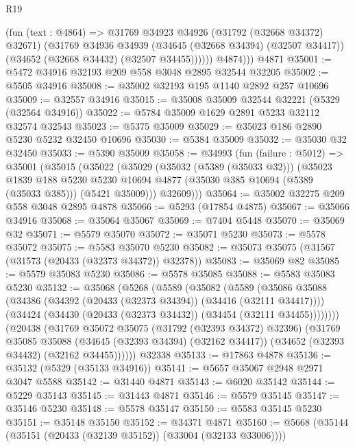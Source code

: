 \begin{lexlean}{R19}
\begin{coremodule}
            (fun (text : @4864) =>
            @31769
              @34923
              @34926
              (@31792 (@32668 @34372) @32671)
              (@31769
                @34936
                @34939
                (@34645 (@32668 @34394) (@32507 @34417))
                (@34652 (@32668 @34432) (@32507 @34455))))))
          @4874)))
    @4871
@35001 := @5472 @34916 @32193 @209 @558 @3048 @2895 @32544 @32205
@35002 := @5505 @34916
@35008 := @35002 @32193 @195 @1140 @2892 @257 @10696
@35009 := @32557 @34916
@35015 := @35008 @35009 @32544 @32221 (@5329 (@32564 @34916))
@35022 := @5784 @35009 @1629 @2891 @5233 @32112 @32574 @32543
@35023 := @5375 @35009
@35029 := @35023 @186 @2890 @5230 @5232 @32450 @10696
@35030 := @5384 @35009
@35032 := @35030 @32 @32450
@35033 := @5390 @35009
@35058 := @34993
    (fun (failure : @5012) =>
    @35001
      (@35015
        (@35022
          (@35029
            (@35032 (@5389 (@35033 @32)))
            (@35023
              @1839
              @188
              @5230
              @5230
              @10694
              @4877
              (@35030 @385 @10694 (@5389 (@35033 @385)))
              (@5421 @35009)))
          @32609)))
@35064 := @35002 @32275 @209 @558 @3048 @2895 @4878
@35066 := @5293 (@17854 @4875)
@35067 := @35066 @34916
@35068 := @35064 @35067
@35069 := @7404 @5448
@35070 := @35069 @32
@35071 := @5579 @35070
@35072 := @35071 @5230
@35073 := @5578 @35072
@35075 := @5583 @35070 @5230
@35082 := @35073 @35075 (@31567 (@31573 (@20433 (@32373 @34372)) @32378))
@35083 := @35069 @82
@35085 := @5579 @35083 @5230
@35086 := @5578 @35085
@35088 := @5583 @35083 @5230
@35132 := @35068
    (@5268
      (@5589
        (@35082
          (@5589
            (@35086
              @35088
              (@34386 (@34392 (@20433 (@32373 @34394)) (@34416 (@32111 @34417))))
              (@34424 (@34430 (@20433 (@32373 @34432)) (@34454 (@32111 @34455))))))))
      (@20438
        (@31769
          @35072
          @35075
          (@31792 (@32393 @34372) @32396)
          (@31769
            @35085
            @35088
            (@34645 (@32393 @34394) (@32162 @34417))
            (@34652 (@32393 @34432) (@32162 @34455))))))
    @32338
@35133 := @17863 @4878
@35136 := @35132 (@5329 (@35133 @34916))
@35141 := @5657 @35067 @2948 @2971 @3047 @5588
@35142 := @31440 @4871
@35143 := @6020 @35142
@35144 := @5229 @35143
@35145 := @31443 @4871
@35146 := @5579 @35145
@35147 := @35146 @5230
@35148 := @5578 @35147
@35150 := @5583 @35145 @5230
@35151 := @35148 @35150
@35152 := @34371 @4871
@35160 := @5668 (@35144 (@35151 (@20433 (@32139 @35152)) (@33004 (@32133 @33006))))

\end{coremodule}
\end{lexlean}
